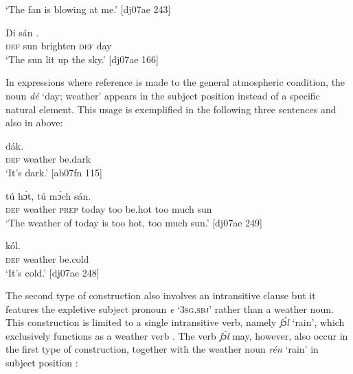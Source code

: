 \glt ‘The fan is blowing at me.’   [dj07ae 243]
\z


\ea%
    \label{ex:key:1241}
    \gll Di  sán      .\\
\textsc{def}  sun  brighten  \textsc{def}  day\\

\glt ‘The sun lit up the sky.’ [dj07ae 166]
\z

In expressions where reference is made to the general atmospheric condition, the noun \textit{dé} ‘day; weather’ appears in the subject position instead of a specific natural element. This usage is exemplified in the following three sentences and also in  above: 


\ea%
    \label{ex:key:1242}
    \gll {}      dák.\\
\textsc{def}  weather  be.dark\\

\glt ‘It’s dark.’ [ab07fn 115]
\z


\ea%
    \label{ex:key:1243}
    \gll {}            tú  hɔ́t,    tú  mɔ́ch  sán.\\
\textsc{def}  weather  \textsc{prep}  today  too  be.hot  too  much  sun\\

\glt ‘The weather of today is too hot, too much sun.’ [dj07ae 249]
\z


\ea%
    \label{ex:key:1244}
    \gll {}      kól.\\
\textsc{def}  weather  be.cold\\

\glt ‘It’s cold.’ [dj07ae 248]
\z

The second type of construction also involves an intransitive clause but it features the expletive subject pronoun \textit{e} ‘\textsc{3sg.sbj}’ rather than a weather noun. This construction is limited to a single intransitive verb, namely \textit{fɔ́l} ‘rain’, which exclusively functions as a weather verb . The verb \textit{fɔ́l} may, however, also occur in the first type of construction, together with the weather noun \textit{rén} ‘rain’ in subject position :


